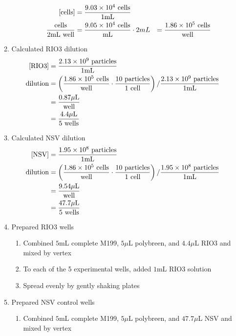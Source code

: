 \begin{enumerate}
\begin{enumerate}
\begin{enumerate}
					\begin{align*}
					\text{[cells]} &= \frac{9.03\times 10^{4}\text{ cells}}{1\text{mL}} \\
					\frac{\text{cells}}{2\text{mL well}} &= \frac{9.05\times 10^{4}\text{ cells}}{\text{mL}} \cdot 2mL &= \frac{1.86\times 10^{5}\text{ cells}}{\text{well}}\\
					\end{align*}
				\end{enumerate}
			\item Calculated RIO3 dilution
				\begin{align*}
					\text{[RIO3]} &= \frac{2.13\times 10^{9}\text{ particles}}{1\text{mL}}\\
					\text{dilution}&= \left(\frac{1.86\times 10^{5}\text{ cells}}{\text{well}}\cdot \frac{10\text{ particles}}{1\text{ cell}}\right)/\frac{2.13\times 10^{9}\text{ particles}}{1\text{mL}}\\
					&= \frac{0.87\mu\text{L}}{\text{well}}\\
					&= \frac{4.4\mu\text{L}}{5\text{ wells}}
				\end{align*}
			\item Calculated NSV dilution
				\begin{align*}
					\text{[NSV]} &= \frac{1.95\times 10^{8}\text{ particles}}{1\text{mL}}\\
					\text{dilution}&= \left(\frac{1.86\times 10^{5}\text{ cells}}{\text{well}}\cdot \frac{10\text{ particles}}{1\text{ cell}}\right)/\frac{1.95\times 10^{8}\text{ particles}}{1\text{mL}}\\
					&= \frac{9.54\mu\text{L}}{\text{well}}\\
					&= \frac{47.7\mu\text{L}}{5\text{ wells}}
				\end{align*}
			\item Prepared RIO3 wells
				\begin{enumerate}
					\item Combined $5$mL complete M199, $5\mu$L polybreen, and $4.4\mu$L RIO3 and mixed by vertex
					\item To each of the 5 experimental wells, added $1$mL RIO3 solution
					\item Spread evenly by gently shaking plates
				\end{enumerate}
			\item Prepared NSV control wells
				\begin{enumerate}
					\item Combined $5$mL complete M199, $5\mu$L polybreen, and $47.7\mu$L NSV and mixed by vertex

\end{enumerate}
\end{enumerate}
\end{enumerate}

